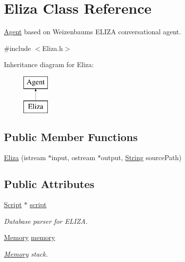 \hypertarget{classEliza}{}\section{Eliza Class Reference}
\label{classEliza}


\mbox{\hyperlink{classAgent}{Agent}} based on Weizenbaum\textquotesingle{}s E\+L\+I\+ZA conversational agent.  




{\ttfamily \#include $<$Eliza.\+h$>$}

Inheritance diagram for Eliza\+:\begin{figure}[H]
\begin{center}
\leavevmode
\includegraphics[height=2.000000cm]{classEliza}
\end{center}
\end{figure}
\subsection*{Public Member Functions}
\begin{DoxyCompactItemize}
\item 
\mbox{\hyperlink{classEliza_a6246b8f323f27e7b5762560ad4ad7c11}{Eliza}} (istream $\ast$input, ostream $\ast$output, \mbox{\hyperlink{classString}{String}} source\+Path)
\end{DoxyCompactItemize}
\subsection*{Public Attributes}
\begin{DoxyCompactItemize}
\item 
\mbox{\label{classEliza_aa4f2c7a48333da7b14c5e24c1bd49f51}} 
\mbox{\hyperlink{classScript}{Script}} $\ast$ \mbox{\hyperlink{classEliza_aa4f2c7a48333da7b14c5e24c1bd49f51}{script}}
\begin{DoxyCompactList}\small\item\em Database parser for E\+L\+I\+ZA. \end{DoxyCompactList}\item 
\mbox{\label{classEliza_a2414a3a9a6e096752a27ae5140068c17}} 
\mbox{\hyperlink{classMemory}{Memory}} \mbox{\hyperlink{classEliza_a2414a3a9a6e096752a27ae5140068c17}{memory}}
\begin{DoxyCompactList}\small\item\em \mbox{\hyperlink{classMemory}{Memory}} stack. \end{DoxyCompactList}\end{DoxyCompactItemize}
